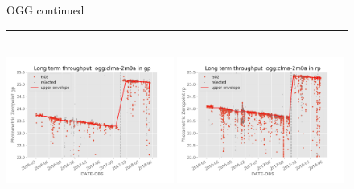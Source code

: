 \documentclass[]{spieman}
\begin{document}
\begin{figure}\ContinuedFloat
\centering 
OGG continued \\ 
\rule{\textwidth}{0.4pt} \\
\includegraphics[width=0.49\textwidth]{images/photzptrend-ogg-clma-2m0a-gp.png} \hspace*{\fill}
\includegraphics[width=0.49\textwidth]{images/photzptrend-ogg-clma-2m0a-rp.png} \\[1ex]


\end{figure}
\end{document}

